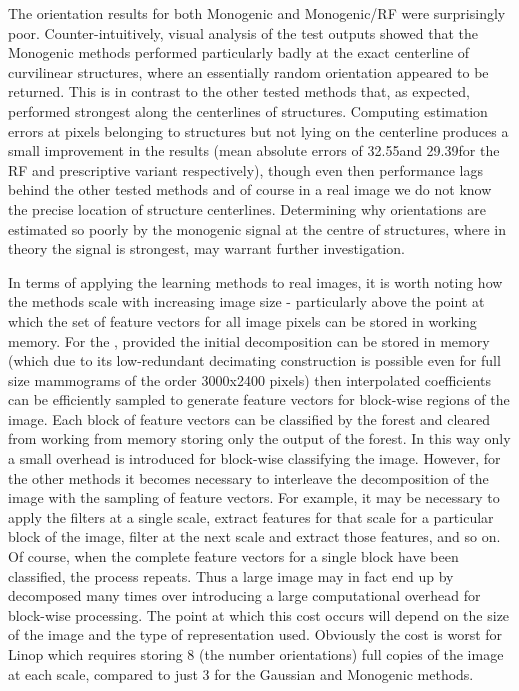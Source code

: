The orientation results for both Monogenic and Monogenic/RF were surprisingly poor. Counter-intuitively, visual analysis of the test outputs showed that the Monogenic methods performed particularly badly at the exact centerline of curvilinear structures, where an essentially random orientation appeared to be returned. This is in contrast to the other tested methods that, as expected, performed strongest along the centerlines of structures. Computing estimation errors at pixels belonging to structures but not lying on the centerline produces a small improvement in the results (mean absolute errors of 32.55\deg and 29.39\deg for the RF and prescriptive variant respectively), though even then performance lags behind the other tested methods and of course in a real image we do not know the precise location of structure centerlines. Determining why orientations are estimated so poorly by the monogenic signal at the centre of structures, where in theory the signal is strongest, may warrant further investigation.




In terms of applying the learning methods to real images, it is worth noting how the methods scale with increasing image size - particularly above the point at which the set of feature vectors for all image pixels can be stored in working memory. For the \dtcwt{}, provided the initial decomposition can be stored in memory (which due to its low-redundant decimating construction is possible even for full size mammograms of the order 3000x2400 pixels) then interpolated coefficients can be efficiently sampled to generate feature vectors for block-wise regions of the image. Each block of feature vectors can be classified by the forest and cleared from working from memory storing only the output of the forest. In this way only a small overhead is introduced for block-wise classifying the image. However, for the other methods it becomes necessary to interleave the decomposition of the image with the sampling of feature vectors. For example, it may be necessary to apply the filters at a single scale, extract features for that scale for a particular block of the image, filter at the next scale and extract those features, and so on. Of course, when the complete feature vectors for a single block have been classified, the process repeats. Thus a large image may in fact end up by decomposed many times over introducing a large computational overhead for block-wise processing. The point at which this cost occurs will depend on the size of the image and the type of representation used. Obviously the cost is worst for Linop which requires storing 8 (\ie the number orientations) full copies of the image at each scale, compared to just 3 for the Gaussian and Monogenic methods.



